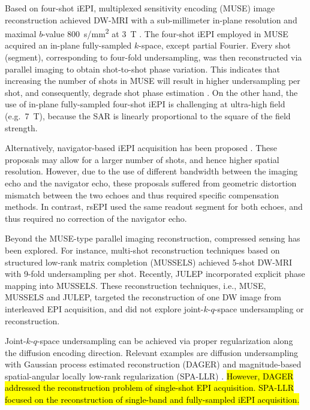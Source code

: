 \documentclass[preprint,12pt,authoryear,review]{elsarticle}
\begin{document}
    Based on four-shot iEPI,
    multiplexed sensitivity encoding (MUSE) image reconstruction
    achieved DW-MRI with a sub-millimeter in-plane resolution
    and maximal $b$-value \SI{800}{s/mm^2} at \SI{3}{\tesla}
    \citep{chen_2013_muse}.
    The four-shot iEPI employed in MUSE acquired
    an in-plane fully-sampled $k$-space, except partial Fourier.
    Every shot (segment), corresponding to four-fold undersampling,
    was then reconstructed via parallel imaging
    to obtain shot-to-shot phase variation.
    This indicates that increasing the number of shots in MUSE
    will result in higher undersampling per shot,
    and consequently, degrade shot phase estimation \citep{wu_2017_diff}.
    On the other hand, the use of in-plane fully-sampled four-shot iEPI
    is challenging at ultra-high field (e.g.~\SI{7}{\tesla}),
    because the SAR is linearly proportional
    to the square of the field strength.

    Alternatively, navigator-based iEPI acquisition has been proposed
    \citep{jeong_2013_navims,dai_2017_navi,dai_2018_navi}.
    These proposals may allow for a larger number of shots,
    and hence higher spatial resolution.
    However, due to the use of different bandwidth
    between the imaging echo and the navigator echo,
    these proposals suffered from geometric distortion mismatch
    between the two echoes and thus required specific compensation methods.
    In contrast, rsEPI \citep{porter_2009_resolve,heidemann_2010_resolve7t}
    used the same readout segment for both echoes,
    and thus required no correction of the navigator echo.

    Beyond the MUSE-type parallel imaging reconstruction,
    compressed sensing \citep{lustig_2007_cs,block_2007_cs}
    has been explored.
    For instance, multi-shot reconstruction techniques
    based on structured low-rank matrix completion (MUSSELS)
    \citep{mani_2017_mussels,bilgic_2019_neatr} achieved
    5-shot DW-MRI with 9-fold undersampling per shot.
    Recently, JULEP \citep{dai_2023_julep}
    incorporated explicit phase mapping into MUSSELS.
    These reconstruction techniques, i.e., MUSE, MUSSELS and JULEP,
    targeted the reconstruction of one DW image
    from interleaved EPI acquisition,
    and did not explore joint-$k$-$q$-space undersampling or reconstruction.

    Joint-$k$-$q$-space undersampling can be achieved
    via proper regularization along the diffusion encoding direction.
    Relevant examples are diffusion undersampling
    with Gaussian process estimated reconstruction (DAGER)
    \citep{wu_2019_dager} and
    magnitude-based spatial-angular locally low-rank regularization
    (SPA-LLR) \citep{hu_2020_spa_llr}.
    \hl{However, DAGER addressed the reconstruction problem
    of single-shot EPI acquisition.
    SPA-LLR focused on the reconstruction
    of single-band and fully-sampled iEPI acquisition.}
\end{document}
